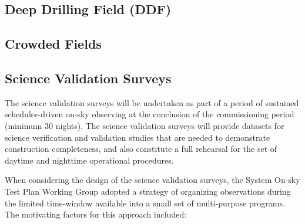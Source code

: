 \documentclass[SE,authoryear,toc,lsstdraft]{lsstdoc}
\begin{document}
\subsection{Deep Drilling Field (DDF)}



\subsection{Crowded Fields}




\subsection{Science Validation Surveys}

The science validation surveys will be undertaken as part of a period of sustained scheduler-driven on-sky observing at the conclusion of the commissioning period (minimum 30 nights).
The science validation surveys will provide datasets for science verification and validation studies that are needed to demonstrate construction completeness, and also constitute a full rehearsal for the set of daytime and nighttime operational procedures.

When considering the design of the science validation surveys, the System On-sky Test Plan Working Group adopted a strategy of organizing observations during the limited time-window available into a small set of multi-purpose programs.
The motivating factors for this approach included:
\end{document}
